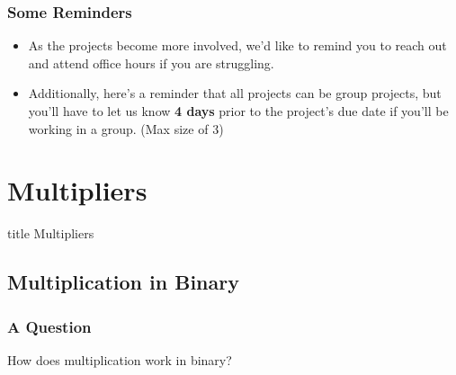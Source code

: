 \documentclass{beamer}
\begin{document}
            \begin{frame}
            	\frametitle{Some Reminders}
            	\begin{itemize}
            		\item As the projects become more involved, we'd like to remind you to reach out and attend office hours if you are struggling.
                    \item Additionally, here's a reminder that all projects can be group projects, but you'll have to let us know \textbf{4 days} prior to the project's due date if you'll be working in a group. (Max size of 3)
            	\end{itemize}
            	
            \end{frame}
        
    \section{Multipliers}
    
    	\begin{frame}
                \vfill
                \centering
                \begin{beamercolorbox}[sep=8pt,center,shadow=true,rounded=true]{title}
                    Multipliers\par%
                \end{beamercolorbox}
                \vfill
             \end{frame}
    
    	\subsection{Multiplication in Binary}
    
    	\begin{frame}
    		\frametitle{A Question}
    		\begin{center}
    			{\Large How does multiplication work in binary?}
    		\end{center}
    	\end{frame}
    	
\end{document}
